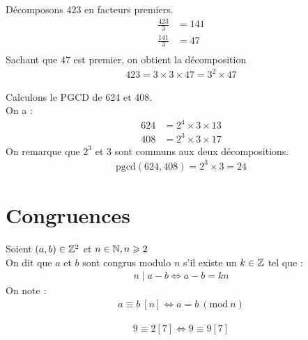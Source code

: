 \begin{exemple}
Décomposons $423$ en facteurs premiers.
\begin{align*}
\frac{423}{3} &= 141 \\
\frac{141}{3} &= 47 \\
\end{align*}
Sachant que $47$ est premier, on obtient la décomposition
\begin{align*}
423 = 3 \times 3 \times 47 = 3^2 \times 47
\end{align*}
\end{exemple}

\begin{exemple}
Calculons le PGCD de 624 et 408.\\
On a :
\begin{align*}
624 &= 2^4 \times 3 \times 13 \\
408 &= 2^3 \times 3 \times 17
\end{align*}
On remarque que $2^3$ et $3$ sont communs aux deux décompositions.
\begin{align*}
\mathrm{pgcd}(624, 408) = 2^3 \times 3 = 24
\end{align*}
\end{exemple}

\section{Congruences}
\begin{graybox}
\begin{definition}[Congruence]
	Soient $(a, b) \in \mathbb{Z}^2$ et $n \in \mathbb{N}, n \geqslant 2$ \\
	On dit que $a$ et $b$ sont congrus modulo $n$ s'il existe un $k \in \mathbb{Z}$ tel que :
	\begin{align*}
	n \mid a - b \iff a - b = kn
	\end{align*}
	On note : 
	\begin{align*}
	a \equiv b \ [n] \iff a = b \ (\mathrm{mod}\ n)
	\end{align*}
\end{definition}
\end{graybox}

\begin{exemple}
\begin{align*}
9 \equiv 2 [7] \iff 9 \equiv 9 [7]
\end{align*}
\end{exemple}

